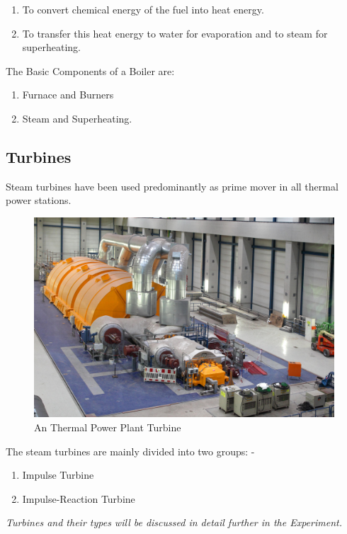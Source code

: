 \documentclass[11pt]{article}
\begin{document}
\begin{enumerate}
	\item To convert chemical energy of the fuel into heat energy. 
	\item To transfer this heat energy to water for evaporation and to steam for superheating. 
\end{enumerate}

The Basic Components of a Boiler are:
\begin{enumerate}
	\item Furnace and Burners
	\item Steam and Superheating.
\end{enumerate}

\subsection{Turbines}
Steam turbines have been used predominantly as prime mover in all
thermal power stations.\\


\begin{figure}[H]
	\centering
	\includegraphics[scale=0.06]{turbine.jpg}
	\caption{An Thermal Power Plant Turbine}
	\label{turbine}
\end{figure}

The steam turbines are mainly divided into two groups: -
\begin{enumerate}
	\item Impulse Turbine
	\item Impulse-Reaction Turbine
\end{enumerate}

\textit{Turbines and their types will be discussed in detail further in the Experiment. 
}
\end{document}
